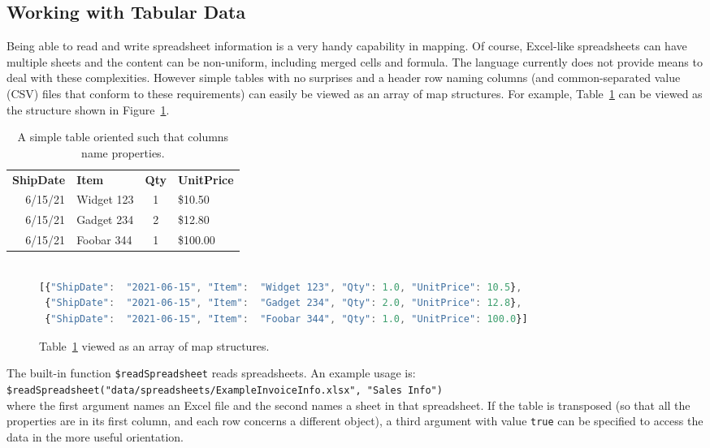 \documentclass[9pt,letterpaper]{article}
\newcommand{\stt}[1]{\texttt{#1}}
\begin{document}
\subsection{Working with Tabular Data}

Being able to read  and write spreadsheet information is a very handy capability in mapping.
Of course, Excel-like spreadsheets can have multiple sheets and the content can be non-uniform, including merged cells and formula.
The language currently does not provide means to deal with these complexities.
However simple tables with no surprises and a header row naming columns (and common-separated value (CSV) files that conform to these requirements) can easily be viewed as an array of map structures.
For example, Table~\ref{table:simple} can be viewed as the structure shown in Figure~\ref{code:simple}.

\begin{table}[H]
  \caption{A simple table oriented such that columns name properties.}
\label{table:simple}
\begin{tabular}{r | l | c | l}

\textbf{ShipDate}& \textbf{Item}& \textbf{Qty}& \textbf{UnitPrice} \\ \hhline{=|=|=|=}
        6/15/21	      & Widget 123   &	1	   &  \$10.50 \\
        6/15/21	      & Gadget 234   &	2	   &  \$12.80 \\
        6/15/21	      & Foobar 344   &	1	   &  \$100.00
\end{tabular}
\end{table}

\begin{figure}[H]
    \caption{Table~\ref{table:simple} viewed as an array of map structures.}
    \label{code:simple}
\begin{lstlisting}[language=JavaScript]

[{"ShipDate":  "2021-06-15", "Item":  "Widget 123", "Qty": 1.0, "UnitPrice": 10.5},
 {"ShipDate":  "2021-06-15", "Item":  "Gadget 234", "Qty": 2.0, "UnitPrice": 12.8},
 {"ShipDate":  "2021-06-15", "Item":  "Foobar 344", "Qty": 1.0, "UnitPrice": 100.0}]
\end{lstlisting}
\end{figure}

The built-in function \stt{\$readSpreadsheet} reads spreadsheets.
An example usage is:\\
\vspace{3mm}
\stt{\$readSpreadsheet("data/spreadsheets/ExampleInvoiceInfo.xlsx", "Sales Info")} \\
\vspace{3mm}
where the first argument names an Excel file and the second names a sheet in that spreadsheet.
If the table is transposed (so that all the properties are in its first column, and each row concerns a different object), a third argument with value \stt{true} can be specified to access the data in the more useful orientation.
\end{document}
